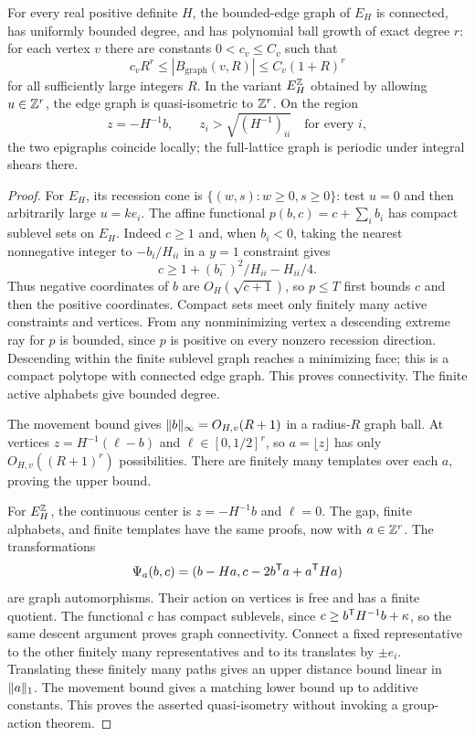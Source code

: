 \begin{theorem}\label{thm:growth}
For every real positive definite $H$, the bounded-edge graph of $E_H$ is connected, has uniformly bounded degree, and has polynomial ball growth of exact degree $r$: for each vertex $v$ there are constants $0<c_v\le C_v$ such that
\[
 c_vR^r\le |B_{\mathrm{graph}}(v,R)|\le C_v(1+R)^r
\]
for all sufficiently large integers $R$. In the variant $E_H^{\mathbb Z}$ obtained by allowing $u\in\mathbb Z^r$, the edge graph is quasi-isometric to $\mathbb Z^r$. On the region
\[
 z=-H^{-1}b,\qquad z_i>\sqrt{(H^{-1})_{ii}}\quad\text{for every }i,
\]
the two epigraphs coincide locally; the full-lattice graph is periodic under integral shears there.
\end{theorem}
\begin{proof}
For $E_H$, its recession cone is $\{(w,s):w\ge0,s\ge0\}$: test $u=0$ and then arbitrarily large $u=ke_i$. The affine functional $p(b,c)=c+\sum_i b_i$ has compact sublevel sets on $E_H$. Indeed $c\ge1$ and, when $b_i<0$, taking the nearest nonnegative integer to $-b_i/H_{ii}$ in a $y=1$ constraint gives
\[
 c\ge1+(b_i^-)^2/H_{ii}-H_{ii}/4.
\]
Thus negative coordinates of $b$ are $O_H(\sqrt{c+1})$, so $p\le T$ first bounds $c$ and then the positive coordinates. Compact sets meet only finitely many active constraints and vertices. From any nonminimizing vertex a descending extreme ray for $p$ is bounded, since $p$ is positive on every nonzero recession direction. Descending within the finite sublevel graph reaches a minimizing face; this is a compact polytope with connected edge graph. This proves connectivity. The finite active alphabets give bounded degree.

The movement bound gives $\lVert b\rVert_\infty=O_{H,v}(R+1)$ in a radius-$R$ graph ball. At vertices $z=H^{-1}(\ell-b)$ and $\ell\in[0,1/2]^r$, so $a=\lfloor z\rfloor$ has only $O_{H,v}((R+1)^r)$ possibilities. There are finitely many templates over each $a$, proving the upper bound.

For $E_H^{\mathbb Z}$, the continuous center is $z=-H^{-1}b$ and $\ell=0$. The gap, finite alphabets, and finite templates have the same proofs, now with $a\in\mathbb Z^r$. The transformations
\[
 \Psi_a(b,c)=(b-Ha,c-2b^{\mathsf T} a+a^{\mathsf T} Ha)
\]
are graph automorphisms. Their action on vertices is free and has a finite quotient. The functional $c$ has compact sublevels, since $c\ge b^{\mathsf T} H^{-1}b+\kappa$, so the same descent argument proves graph connectivity. Connect a fixed representative to the other finitely many representatives and to its translates by $\pm e_i$. Translating these finitely many paths gives an upper distance bound linear in $\lVert a\rVert_1$. The movement bound gives a matching lower bound up to additive constants. This proves the asserted quasi-isometry without invoking a group-action theorem.


\end{proof}
